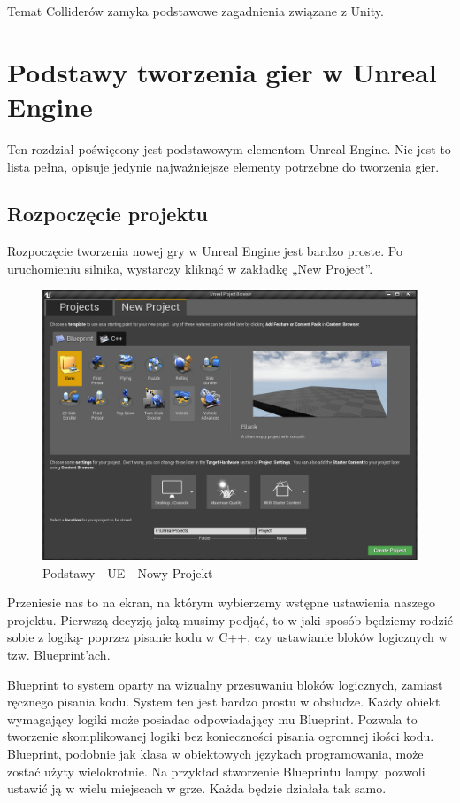 \documentclass[brudnopis]{xmgr}
\begin{document}
Temat Colliderów zamyka podstawowe zagadnienia związane z Unity. 

\chapter{Podstawy tworzenia gier w Unreal Engine}

Ten rozdział poświęcony jest podstawowym elementom Unreal Engine. Nie jest to lista pełna, opisuje jedynie najważniejsze elementy potrzebne do tworzenia gier.

\section{Rozpoczęcie projektu}

Rozpoczęcie tworzenia nowej gry w Unreal Engine jest bardzo proste. Po uruchomieniu silnika, wystarczy kliknąć w zakładkę „New Project”.

\begin{figure}[!htb]
    \begin{center}
    \includegraphics[scale=0.35]{Screeny/New_project}
    \end{center}
    \caption{Podstawy - UE - Nowy Projekt}
\end{figure}

Przeniesie nas to na ekran, na którym wybierzemy wstępne ustawienia naszego projektu. Pierwszą decyzją jaką musimy podjąć, to w jaki sposób będziemy rodzić sobie z logiką- poprzez pisanie kodu w C++, czy ustawianie bloków logicznych w tzw. Blueprint’ach.

Blueprint to system oparty na wizualny przesuwaniu bloków logicznych, zamiast ręcznego pisania kodu. System ten jest bardzo prostu w obsłudze. Każdy obiekt wymagający logiki może posiadac odpowiadający mu Blueprint. Pozwala to tworzenie skomplikowanej logiki bez konieczności pisania ogromnej ilości kodu. Blueprint, podobnie jak klasa w obiektowych językach programowania, może zostać użyty wielokrotnie. Na przykład stworzenie Blueprintu lampy, pozwoli ustawić ją w wielu miejscach w grze. Każda będzie działała tak samo.
\end{document}
